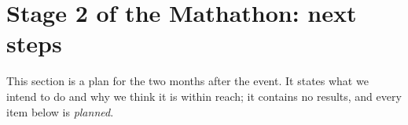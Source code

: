 \section{Stage 2 of the Mathathon: next steps}\label{sec:stage2}

This section is a plan for the two months after the event. It states what we intend to do and why we think it is within
reach; it contains no results, and every item below is \emph{planned}.

